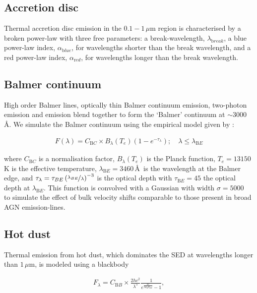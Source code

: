 \subsection{Accretion disc}

Thermal accretion disc emission in the $0.1 - 1$\,$\mu$m region is characterised by a broken power-law with three free parameters: a break-wavelength, $\lambda_{\mathrm break}$, a blue power-law index, $\alpha_{\mathrm blue}$, for wavelengths shorter than the break wavelength, and a red power-law index, $\alpha_{\mathrm red}$, for wavelengths longer than the break wavelength.

\subsection{Balmer continuum}

High order Balmer lines, optically thin Balmer continuum emission, two-photon emission and  emission blend together to form the `Balmer' continuum at $\sim3000$\,\AA.
We simulate the Balmer continuum using the empirical model given by \citet{grandi82}: 

\begingroup\makeatletter{}\check@mathfonts
\begin{eqnarray}
  F(\lambda) = C_{\mathrm BC} \times B_\lambda(T_e)(1-e^{-\tau_\lambda}); \quad \lambda \leq \lambda_{\mathrm BE}
\end{eqnarray}
\endgroup

\noindent where $C_{\mathrm BC}$ is a normalisation factor, $B_\lambda(T_e)$ is the Planck function, $T_e=13150$\,K is the effective temperature, $\lambda_{\mathrm BE}=3460$\,\AA\, is the wavelength at the Balmer edge, and $\tau_\lambda = \tau_{BE}\left( \nicefrac{\lambda_{BE}} {\lambda} \right)^{-3}$ is the optical depth with $\tau_{\mathrm BE}=45$ the optical depth at $\lambda_{\mathrm BE}$. 
This function is convolved with a Gaussian with width $\sigma=5000$\,\kms\, to simulate the effect of bulk velocity shifts comparable to those present in broad AGN emission-lines. 

\subsection{Hot dust}

Thermal emission from hot dust, which dominates the SED at wavelengths longer than $1$\,$\mu$m, is modeled using a blackbody

\begingroup\makeatletter{}\check@mathfonts
\begin{eqnarray}  
  F_\lambda = C_{\mathrm BB} \times \frac{2 hc^2}{\lambda^5}\frac{1}{ e^{\frac{hc}{\lambda k_\mathrm{B}T_{\mathrm BB}}} - 1}, 
\end{eqnarray}
\endgroup

